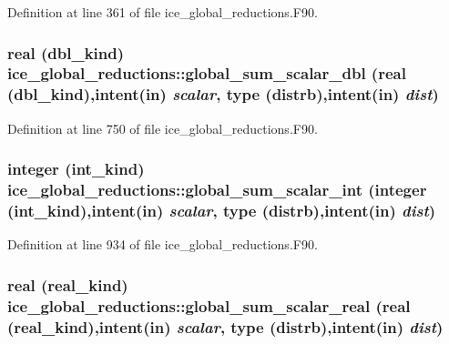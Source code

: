 Definition at line 361 of file ice\_\-global\_\-reductions.F90.\hypertarget{namespaceice__global__reductions_a019a480688c267b2dfce991d9c8e0d51}{
\subsubsection[{global\_\-sum\_\-scalar\_\-dbl}]{\setlength{\rightskip}{0pt plus 5cm}real (dbl\_\-kind) ice\_\-global\_\-reductions::global\_\-sum\_\-scalar\_\-dbl (real (dbl\_\-kind),intent(in) {\em scalar}, \/  type (distrb),intent(in) {\em dist})}}
\label{namespaceice__global__reductions_a019a480688c267b2dfce991d9c8e0d51}


Definition at line 750 of file ice\_\-global\_\-reductions.F90.\hypertarget{namespaceice__global__reductions_a1d53804ee999b9e2c22cfb731f48c5ff}{
\subsubsection[{global\_\-sum\_\-scalar\_\-int}]{\setlength{\rightskip}{0pt plus 5cm}integer (int\_\-kind) ice\_\-global\_\-reductions::global\_\-sum\_\-scalar\_\-int (integer (int\_\-kind),intent(in) {\em scalar}, \/  type (distrb),intent(in) {\em dist})}}
\label{namespaceice__global__reductions_a1d53804ee999b9e2c22cfb731f48c5ff}


Definition at line 934 of file ice\_\-global\_\-reductions.F90.\hypertarget{namespaceice__global__reductions_a909b7495f4cdff7e8d357fa0acdeca74}{
\subsubsection[{global\_\-sum\_\-scalar\_\-real}]{\setlength{\rightskip}{0pt plus 5cm}real (real\_\-kind) ice\_\-global\_\-reductions::global\_\-sum\_\-scalar\_\-real (real (real\_\-kind),intent(in) {\em scalar}, \/  type (distrb),intent(in) {\em dist})}}
\label{namespaceice__global__reductions_a909b7495f4cdff7e8d357fa0acdeca74}


